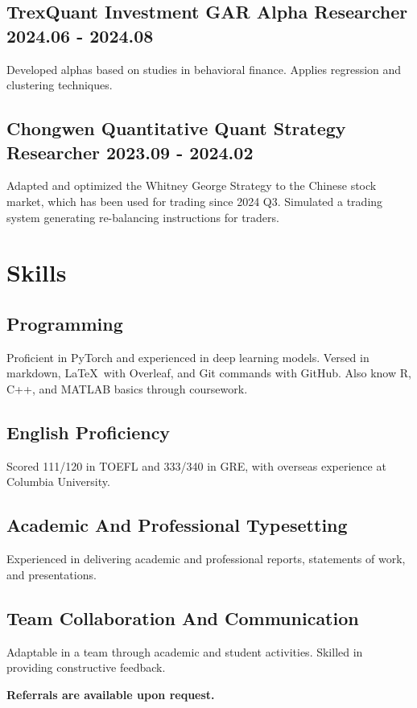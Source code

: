 \documentclass[a4paper]{article}
\begin{document}
\subsection{TrexQuant Investment \normalfont \hfill GAR Alpha Researcher \hfill 2024.06 - 2024.08}
Developed alphas based on studies in behavioral finance. Applies regression and clustering techniques.
\subsection{Chongwen Quantitative \normalfont\hfill Quant Strategy Researcher  \hfill 2023.09 - 2024.02}
Adapted and optimized the Whitney George Strategy to the Chinese stock market, which has been used for trading since 2024 Q3. Simulated a trading system generating re-balancing instructions for traders.

\section{Skills}

\subsection{Programming}
Proficient in PyTorch and experienced in deep learning models. Versed in markdown, \LaTeX\ with Overleaf, and Git commands with  GitHub. Also know R, C++, and MATLAB basics through coursework.

\subsection{English Proficiency}
Scored 111/120 in TOEFL and 333/340 in GRE, with overseas experience at Columbia University. 

\subsection{Academic And Professional Typesetting}
Experienced in delivering academic and professional reports, statements of work, and presentations.

\subsection{Team Collaboration And Communication}
Adaptable in a team through academic and student activities. Skilled in providing constructive feedback.

\vfill
\begin{center}
    \textbf{Referrals are available upon request.}
\end{center}
\end{document}
